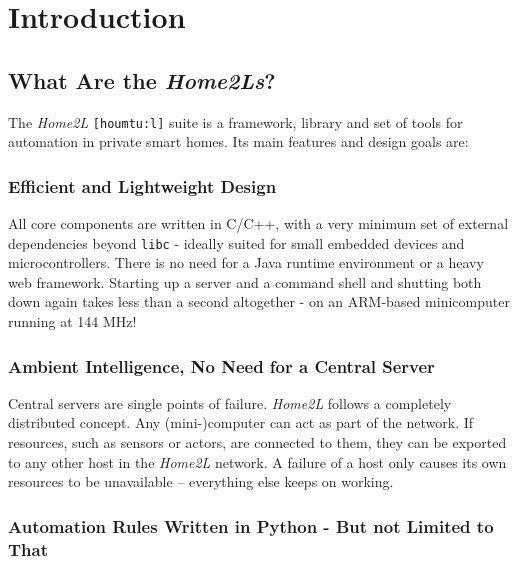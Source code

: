 \documentclass[12pt,english,parskip=half]{scrreprt}
\begin{document}
%
%
\chapter{Introduction}
\label{ch:intro}
%
%



\section{What Are the \emph{Home2Ls}?}
\label{sec:intro-overview}


The \emph{Home2L} \texttt{[houmtu:l]} suite is a framework, library and set of tools
for automation in private smart homes. Its main features and design goals are:


\subsection*{Efficient and Lightweight Design}

All core components are written in C/C++, with a very minimum set of external
dependencies beyond \texttt{libc} - ideally suited for small embedded devices and
microcontrollers. There is no need for a Java runtime environment or a heavy web
framework. Starting up a server and a command shell and shutting both down again
takes less than a second altogether - on an ARM-based minicomputer running
at 144 MHz!


\subsection*{Ambient Intelligence, No Need for a Central Server}

Central servers are single points of failure. \emph{Home2L} follows a completely
distributed concept. Any (mini-)computer can act as part of the network. If
resources, such as sensors or actors, are connected to them, they can be
exported to any other host in the \emph{Home2L} network. A failure of a host only
causes its own resources to be unavailable -- everything else keeps on working.


\subsection*{Automation Rules Written in Python - But not Limited to That}
\end{document}
